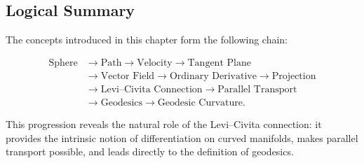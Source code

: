 \documentclass[12pt,a4paper]{article}
\theoremstyle{notespace}
\begin{document}
\subsection{Logical Summary}

The concepts introduced in this chapter form the following chain:

\[
\boxed{
	\begin{aligned}
		\text{Sphere}
		&\longrightarrow
		\text{Path}
		\longrightarrow
		\text{Velocity}
		\longrightarrow
		\text{Tangent Plane}
		\\[1mm]
		&\longrightarrow
		\text{Vector Field}
		\longrightarrow
		\text{Ordinary Derivative}
		\longrightarrow
		\text{Projection}
		\\[1mm]
		&\longrightarrow
		\text{Levi--Civita Connection}
		\longrightarrow
		\text{Parallel Transport}
		\\[1mm]
		&\longrightarrow
		\text{Geodesics}
		\longrightarrow
		\text{Geodesic Curvature}.
	\end{aligned}
}
\]

This progression reveals the natural role of the Levi--Civita connection:
it provides the intrinsic notion of differentiation on curved manifolds,
makes parallel transport possible, and leads directly to the definition of geodesics.
\end{document}
